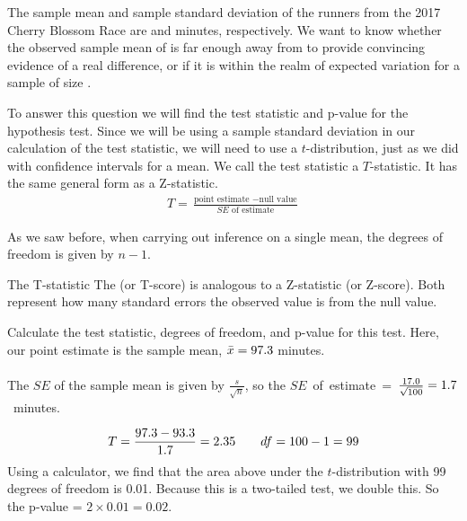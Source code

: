 The sample mean and sample standard deviation of the \cherryblossomn{} runners from the 2017 Cherry Blossom Race are \cherryblossommean{} and \cherryblossomsd{} minutes, respectively. We want to know whether the observed sample mean of \cherryblossommean{} is far enough away from \cherryblossomnull{} to provide convincing evidence of a real difference, or if it is within the realm of expected variation for a sample of size \cherryblossomn{}.  

\D{\newpage}

To answer this question we will find the test statistic and p-value for the hypothesis test.  Since we will be using a sample standard deviation in our calculation of the test statistic, we will need to use a $t$-distribution, just as we did with confidence intervals for a mean.  We call the test statistic a $T$-statistic.  It has the same general form as a Z-statistic.
\begin{align*}
T = \frac{\text{point estimate } - \text{null value}}{SE\text{ of estimate}}
\end{align*}

As we saw before, when carrying out inference on a single mean, the degrees of freedom is given by $n-1$.  


\begin{onebox}{The T-statistic}
The  (or T-score) is analogous to a Z-statistic (or Z-score).  Both represent how many standard errors the observed value is from the null value.
\end{onebox}


\begin{examplewrap}
\begin{nexample}{Calculate the test statistic, degrees of freedom, and p-value for this test.}
Here, our point estimate is the sample mean, $\bar{x}=97.3{}$ minutes.  
\\
\\
The $SE$ of the sample mean is given by $\frac{s}{\sqrt{n}}$, so the \mbox{$SE$ of estimate = $\frac{17.0{}}{ \sqrt{100{}}} = 1.7{}$ minutes.}

\begin{align*}
 T = \frac{97.3{} - 93.3{}}{1.7{}} = 2.35{} \qquad df=100{}-1=99
\end{align*}
Using a calculator, we find that the area above \cherryblossomt{} under the $t$-distribution with 99 degrees of freedom is 0.01.  Because this is a two-tailed test, we double this.  So the p-value = $2\times 0.01 = 0.02.$
\end{nexample}
\end{examplewrap}


